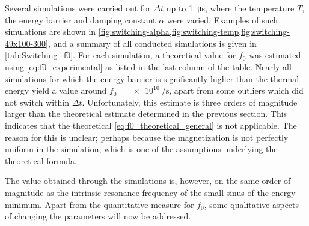 \documentclass[11pt,a4paper,english]{article}
\begin{document}
Several simulations were carried out for $\Delta t$ up to \SI{1}{\micro\second}, where the temperature $T$, the energy barrier and damping constant $\alpha$ were varied. Examples of such simulations are shown in \cref{fig:switching-alpha,fig:switching-temp,fig:switching-49x100-300}, and a summary of all conducted simulations is given in \cref{tab:Switching_f0}. For each simulation, a theoretical value for $f_0$ was estimated using \cref{eq:f0_experimental} as listed in the last column of the table. 
Nearly all simulations for which the energy barrier is significantly higher than the thermal energy yield a value around $f_0=\SI{e10}{\per\second}$, apart from some outliers which did not switch within $\Delta t$. Unfortunately, this estimate is three orders of magnitude larger than the theoretical estimate determined in the previous section. This indicates that the theoretical \cref{eq:f0_theoretical_general} is not applicable. The reason for this is unclear; perhaps because the magnetization is not perfectly uniform in the simulation, which is one of the assumptions underlying the theoretical formula. \par
The value obtained through the simulations is, however, on the same order of magnitude as the intrinsic resonance frequency of the small sinus of the energy minimum.
Apart from the quantitative measure for $f_0$, some qualitative aspects of changing the parameters will now be addressed.
\end{document}
